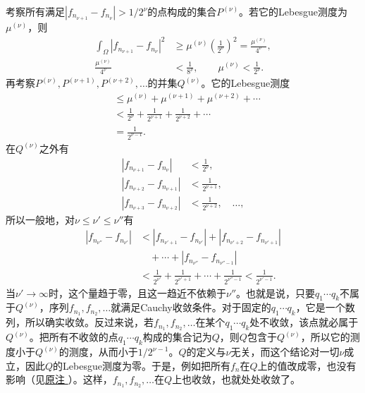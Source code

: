 \documentclass[fontsize=13pt,twoside,openany,headings=normal,parskip=false,bookmarkpackage=false,DIV=calc]{scrbook}
\begin{document}
\hypertarget{origpage-33}{}\label{origpage-33}考察所有满足$|f_{n_{\nu+1}}-f_{n_\nu}|>1/2^\nu$的点构成的集合$P^{(\nu)}$。若它的Lebesgue测度为$\mu^{(\nu)}$，则
\begin{align*}
\int_\Omega|f_{n_{\nu+1}}-f_{n_\nu}|^2
&\geq\mu^{(\nu)}\left(\frac1{2^\nu}\right)^2
=\frac{\mu^{(\nu)}}{4^\nu},\\
\frac{\mu^{(\nu)}}{4^\nu}&<\frac1{8^\nu},\qquad
\mu^{(\nu)}<\frac1{2^\nu}.
\end{align*}
再考察$P^{(\nu)},\allowbreak P^{(\nu+1)},\allowbreak P^{(\nu+2)},\allowbreak \ldots$的并集$Q^{(\nu)}$。它的Lebesgue测度
\begin{align*}
&\leq\mu^{(\nu)}+\mu^{(\nu+1)}+\mu^{(\nu+2)}+\cdots\\
&<\frac1{2^\nu}+\frac1{2^{\nu+1}}+\frac1{2^{\nu+2}}+\cdots\\
&=\frac1{2^{\nu-1}}.
\end{align*}
在$Q^{(\nu)}$之外有
\begin{align*}
|f_{n_{\nu+1}}-f_{n_\nu}|&<\frac1{2^\nu},\\
|f_{n_{\nu+2}}-f_{n_{\nu+1}}|&<\frac1{2^{\nu+1}},\\
|f_{n_{\nu+3}}-f_{n_{\nu+2}}|&<\frac1{2^{\nu+2}},\quad\ldots,
\end{align*}
所以一般地，对$\nu\leq\nu'\leq\nu''$有
\begin{align*}
|f_{n_{\nu''}}-f_{n_{\nu'}}|&<|f_{n_{\nu'+1}}-f_{n_{\nu'}}|+|f_{n_{\nu'+2}}-f_{n_{\nu'+1}}|\\
&\quad+\cdots+|f_{n_{\nu''}}-f_{n_{\nu''-1}}|\\
&<\frac1{2^{\nu'}}+\frac1{2^{\nu'+1}}+\cdots+\frac1{2^{\nu''-1}}<\frac1{2^{\nu'-1}}.
\end{align*}
当$\nu'\to\infty$时，这个量趋于零，且这一趋近不依赖于$\nu''$。也就是说，只要$q_1\cdots q_k$不属于$Q^{(\nu)}$，序列$f_{n_1},\allowbreak f_{n_2},\allowbreak \ldots$就满足Cauchy收敛条件。对于固定的$q_1\cdots q_k$，它是一个数列，所以确实收敛。反过来说，若$f_{n_1},\allowbreak f_{n_2},\allowbreak \ldots$在某个$q_1\cdots q_k$处不收敛，该点就必属于$Q^{(\nu)}$。把所有不收敛的点$q_1\cdots q_k$构成的集合记为$Q$，则$Q$包含于$Q^{(\nu)}$，所以它的测度小于$Q^{(\nu)}$的测度，从而小于$1/2^{\nu-1}$。$Q$的定义与$\nu$无关，而这个结论对一切$\nu$成立，因此$Q$的Lebesgue测度为零。于是，例如把所有$f_n$在$Q$上的值改成零，也没有影响（见\CJKglue \hyperlink{note-54}{原注 }）。这样，$f_{n_1},\allowbreak f_{n_2},\allowbreak \ldots$在$Q$上也收敛，也就处处收敛了。
\end{document}
